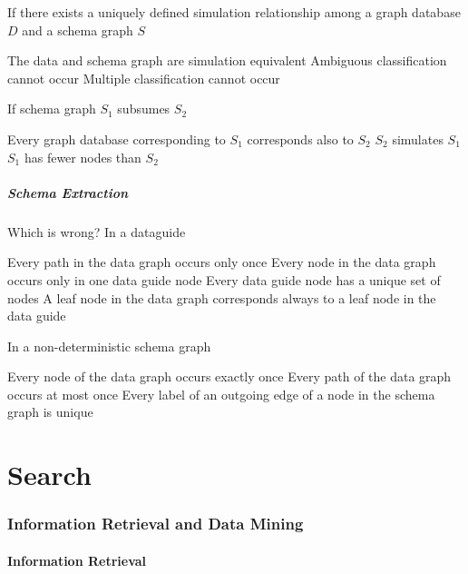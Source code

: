 \documentclass[12pt,a4paper,answers]{exam} %
\begin{document}
\begin{flushleft}
\begin{multicols*}{2}
\begin{questions}
\question If there exists a uniquely defined simulation relationship among a graph database $D$ and a schema graph $S$
\begin{checkboxes}
\choice The data and schema graph are simulation equivalent
\CorrectChoice Ambiguous classification cannot occur
\choice Multiple classification cannot occur
\end{checkboxes}

\question If schema graph $S_1$ subsumes $S_2$
\begin{checkboxes}
\choice Every graph database corresponding to $S_1$ corresponds also to $S_2$
\CorrectChoice $S_2$ simulates $S_1$
\choice $S_1$ has fewer nodes than $S_2$
\end{checkboxes}


\subsubsection{Schema Extraction}

\question Which is wrong? In a dataguide
\begin{checkboxes}
\choice Every path in the data graph occurs only once
\CorrectChoice Every node in the data graph occurs only in one data guide node
\choice Every data guide node has a unique set of nodes
\choice A leaf node in the data graph corresponds always to a leaf node in the data guide
\end{checkboxes}

\question In a non-deterministic schema graph
\begin{checkboxes}
\CorrectChoice Every node of the data graph occurs exactly once
\choice Every path of the data graph occurs at most once
\choice Every label of an outgoing edge of a node in the schema graph is unique
\end{checkboxes}



\part{Search}
\section{Information Retrieval and Data Mining}
\subsection{Information Retrieval} %

\end{questions}
\end{multicols*}
\end{flushleft}
\end{document}
